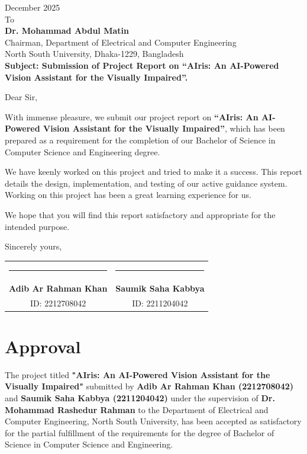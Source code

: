 \documentclass[12pt,a4paper]{report}
\begin{document}
\begin{flushleft}
December 2025 \\
\vspace{0.5cm}
To \\
\textbf{Dr. Mohammad Abdul Matin} \\
Chairman, Department of Electrical and Computer Engineering \\
North South University, Dhaka-1229, Bangladesh \\

\vspace{0.5cm}
\textbf{Subject: Submission of Project Report on ``AIris: An AI-Powered Vision Assistant for the Visually Impaired''.}

\vspace{0.5cm}
Dear Sir,

With immense pleasure, we submit our project report on \textbf{``AIris: An AI-Powered Vision Assistant for the Visually Impaired''}, which has been prepared as a requirement for the completion of our Bachelor of Science in Computer Science and Engineering degree.

We have keenly worked on this project and tried to make it a success. This report details the design, implementation, and testing of our active guidance system. Working on this project has been a great learning experience for us.

We hope that you will find this report satisfactory and appropriate for the intended purpose.

\vspace{1cm}
Sincerely yours,

\vspace{1.5cm}
\begin{tabular}{cc}
\rule{6cm}{0.4pt} & \rule{6cm}{0.4pt} \\
\textbf{Adib Ar Rahman Khan} & \textbf{Saumik Saha Kabbya} \\
ID: 2212708042 & ID: 2211204042
\end{tabular}
\end{flushleft}


\chapter*{Approval}

The project titled \textbf{"AIris: An AI-Powered Vision Assistant for the Visually Impaired"} submitted by \textbf{Adib Ar Rahman Khan (2212708042)} and \textbf{Saumik Saha Kabbya (2211204042)} under the supervision of \textbf{Dr. Mohammad Rashedur Rahman} to the Department of Electrical and Computer Engineering, North South University, has been accepted as satisfactory for the partial fulfillment of the requirements for the degree of Bachelor of Science in Computer Science and Engineering.
\end{document}
